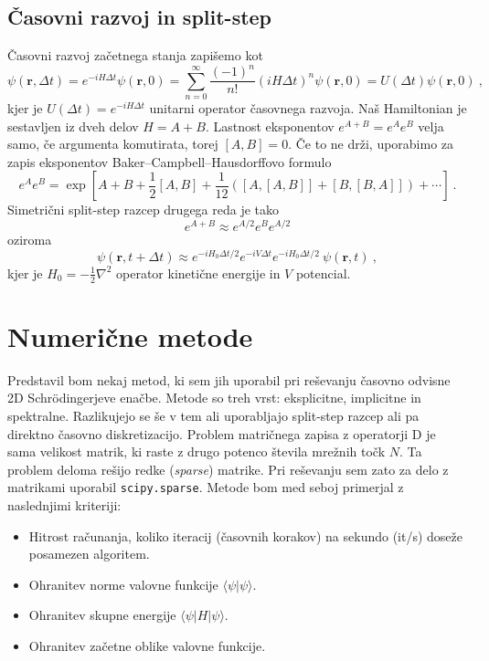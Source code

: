 \documentclass[11pt]{report}
\newcommand{\D}{\text{D}}
\begin{document}
\subsection{Časovni razvoj in split-step}
Časovni razvoj začetnega stanja zapišemo kot
\begin{equation}
	\psi({\mathbf{r}, \Delta t}) = e^{-iH\Delta t} \psi(\mathbf{r}, 0) =
	\sum_{n=0}^\infty \frac{(-1)^n}{n!} \left ( iH\Delta t \right )^n \psi(\mathbf{r}, 0) = U(\Delta t)
	\psi(\mathbf{r}, 0) \>,
\end{equation}
kjer je $U(\Delta t)=e^{-iH\Delta t}$ unitarni operator časovnega razvoja.
Naš Hamiltonian je sestavljen iz dveh delov $H=A+B$. Lastnost eksponentov $e^{A+B}=e^Ae^B$ velja samo, če
argumenta komutirata, torej $[A, B]=0$. Če to ne drži, uporabimo za zapis eksponentov
Baker–Campbell–Hausdorﬀovo formulo
\begin{equation}
	e^{A} e^{B}=\exp \left [A+B+\frac{1}{2}[A, B]+\frac{1}{12}([A,[A, B]]+[B,[B, A]])+\cdots\right ] \>.
\end{equation}
Simetrični split-step razcep drugega reda je tako
\begin{equation}
	e^{A+B} \approx e^{A/2} e^B e^{A/2}
\end{equation}
oziroma
\begin{equation}
	\label{eq: ss}
	\psi(\mathbf{r}, t + \Delta t) \approx e^{-i H_0 \Delta t / 2} e^{-iV \Delta t} e^{-i H_0 \Delta t / 2}
	\> \psi(\mathbf{r}, t) \>,
\end{equation}
kjer je $H_0=-\frac{1}{2} \nabla^2$ operator kinetične energije in $V$ potencial.

\section{Numerične metode}
Predstavil bom nekaj metod, ki sem jih uporabil pri reševanju časovno odvisne 2D
Schr\" odingerjeve enačbe. Metode so treh vrst: eksplicitne, implicitne in spektralne.
Razlikujejo se še v tem ali uporabljajo split-step razcep ali pa direktno časovno diskretizacijo.
Problem matričnega zapisa z operatorji $\D$ je sama velikost matrik, ki raste z drugo potenco števila
mrežnih točk $N$. Ta problem deloma rešijo redke (\emph{sparse}) matrike.
Pri reševanju sem zato za delo z matrikami uporabil \texttt{scipy.sparse}.
Metode bom med seboj primerjal z naslednjimi kriteriji:
\begin{itemize}
	\item Hitrost računanja, koliko iteracij (časovnih korakov) na sekundo (it/s) doseže posamezen algoritem.
	\item Ohranitev norme valovne funkcije $\langle \psi | \psi \rangle$.
	\item Ohranitev skupne energije $\langle \psi | H | \psi \rangle$.
	\item Ohranitev začetne oblike valovne funkcije.
\end{itemize}
\end{document}
